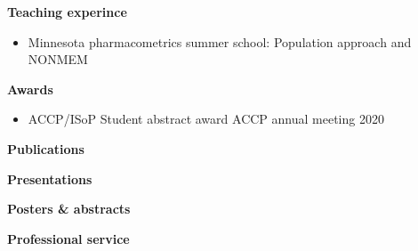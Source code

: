 \documentclass[a4paper,11pt]{article}
\begin{document}
\textbf{Teaching experince} \\
\begin{itemize}
\item Minnesota pharmacometrics summer school: Population approach and NONMEM 
\end{itemize}

\textbf{Awards} \\
\begin{itemize}
\item ACCP/ISoP Student abstract award \hfill ACCP annual meeting 2020
\end{itemize}

\textbf{Publications}\\
\nocite{*}



\textbf{Presentations}

\textbf{Posters \& abstracts}

\textbf{Professional service}
\end{document}
